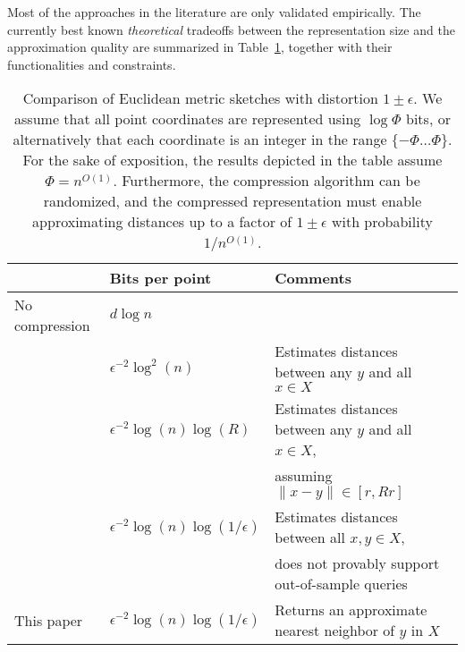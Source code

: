 Most of the approaches in the literature are only validated empirically.
The currently best known {\em theoretical} tradeoffs between the representation size and the approximation quality are summarized in Table~\ref{tbl:sketches_related_work}, together with their functionalities and constraints. 
\begin{table}[h]
\begin{center}
\begin{tabular}{| l | l | l |}
\hline
& 		Bits per point	& Comments \\
\hline
No compression 		& $d  \log n$ 							&  \\
\cite{johnson1984extensions}	& $\epsilon^{-2} \log^2(n)$			& Estimates distances between any $y$ and all $x \in X$\\
 \cite{kushilevitz2000efficient}				& $\epsilon^{-2} \log(n) \log (R)$				& Estimates distances between any $y$ and all $x \in X$,  \\
 & & assuming $\|x-y\| \in [r, R r]$ \\
 \cite{indyk2017near}				& $\epsilon^{-2} \log(n) \log(1/\epsilon)$	& Estimates distances between all $x,y \in X$,  \\
 & & does not provably support out-of-sample queries \\
 \hline
 This paper			& $\epsilon^{-2} \log(n) \log(1/\epsilon)$      & Returns an approximate nearest neighbor of $y$ in $X$\\
 \hline
\end{tabular}
\caption{Comparison of Euclidean metric sketches with distortion $1\pm\epsilon$. We assume that all point coordinates are represented using $\log \Phi$ bits, or alternatively that each coordinate is an integer in the range $\{ -\Phi \ldots \Phi\}$.
For the sake of exposition, the results depicted in the table assume $\Phi=n^{O(1)}$. Furthermore, the compression algorithm can be randomized, and the compressed representation must enable approximating distances up to a factor of $1 \pm \epsilon$ with probability $1/n^{O(1)}$. 
}
\label{tbl:sketches_related_work}
\end{center}
\end{table}

